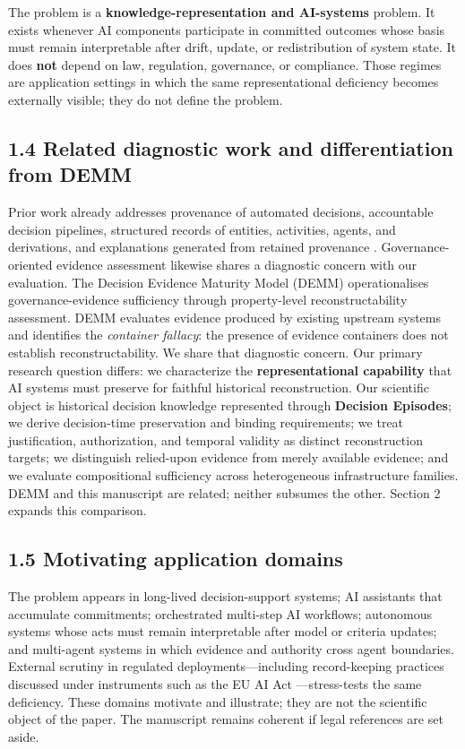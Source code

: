 \documentclass[11pt,a4paper]{article}
\begin{document}
The problem is a \textbf{knowledge-representation and AI-systems} problem. It exists whenever AI components participate in committed outcomes whose basis must remain interpretable after drift, update, or redistribution of system state. It does \textbf{not} depend on law, regulation, governance, or compliance. Those regimes are application settings in which the same representational deficiency becomes externally visible; they do not define the problem.


\subsection{1.4 Related diagnostic work and differentiation from DEMM}

Prior work already addresses provenance of automated decisions, accountable decision pipelines, structured records of entities, activities, agents, and derivations, and explanations generated from retained provenance \citep{singh2019decisionProvenance,huynh2021provenanceExplanations,moreau2013provDm}. Governance-oriented evidence assessment likewise shares a diagnostic concern with our evaluation. The Decision Evidence Maturity Model (DEMM) \citep{solozobov2026demm} operationalises governance-evidence sufficiency through property-level reconstructability assessment. DEMM evaluates evidence produced by existing upstream systems and identifies the \emph{container fallacy}: the presence of evidence containers does not establish reconstructability. We share that diagnostic concern. Our primary research question differs: we characterize the \textbf{representational capability} that AI systems must preserve for faithful historical reconstruction. Our scientific object is historical decision knowledge represented through \textbf{Decision Episodes}; we derive decision-time preservation and binding requirements; we treat justification, authorization, and temporal validity as distinct reconstruction targets; we distinguish relied-upon evidence from merely available evidence; and we evaluate compositional sufficiency across heterogeneous infrastructure families. DEMM and this manuscript are related; neither subsumes the other. Section 2 expands this comparison.


\subsection{1.5 Motivating application domains}

The problem appears in long-lived decision-support systems; AI assistants that accumulate commitments; orchestrated multi-step AI workflows; autonomous systems whose acts must remain interpretable after model or criteria updates; and multi-agent systems in which evidence and authority cross agent boundaries. External scrutiny in regulated deployments---including record-keeping practices discussed under instruments such as the EU AI Act \citep{eu2024aiAct}---stress-tests the same deficiency. These domains motivate and illustrate; they are not the scientific object of the paper. The manuscript remains coherent if legal references are set aside.
\end{document}
